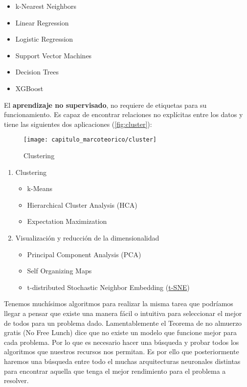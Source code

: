 \begin{itemize}
    \item k-Nearest Neighbors
    \item Linear Regression
    \item Logistic Regression
    \item Support Vector Machines
    \item Decision Trees
    \item XGBoost
\end{itemize} 

El \textbf{aprendizaje no supervisado}, no requiere de etiquetas para su
funcionamiento. Es capaz de encontrar relaciones no explícitas entre los datos y
tiene las siguientes dos aplicaciones (\autoref{fig:cluster}):

\begin{figure}[H]
    \centering
    \texttt{[image: capitulo\_marcoteorico/cluster]}
    \caption{Clustering}\label{fig:cluster}
\end{figure}

\begin{enumerate}
    \item Clustering
    \begin{itemize}
        \item k-Means
        \item Hierarchical Cluster Analysis (HCA)
        \item Expectation Maximization
    \end{itemize}
    \item Visualización y reducción de la dimensionalidad
    \begin{itemize}
        \item Principal Component Analysis (PCA)
        \item Self Organizing Maps
        \item t-distributed Stochastic Neighbor Embedding (\hyperlink{abbr}{t-SNE})
    \end{itemize}
\end{enumerate}

Tenemos muchísimos algoritmos para realizar la misma tarea que podríamos llegar
a pensar que existe una manera fácil o intuitiva para seleccionar el mejor de
todos para un problema dado. Lamentablemente el Teorema de no almuerzo gratis (No Free Lunch)
dice que no existe un modelo que funcione mejor para cada problema. Por lo que
es necesario hacer una búsqueda y probar todos los algoritmos que nuestros
recursos nos permitan. Es por ello que posteriormente haremos una búsqueda entre
todo el muchas arquitecturas neuronales distintas para encontrar aquella que
tenga el mejor rendimiento para el problema a resolver. 

